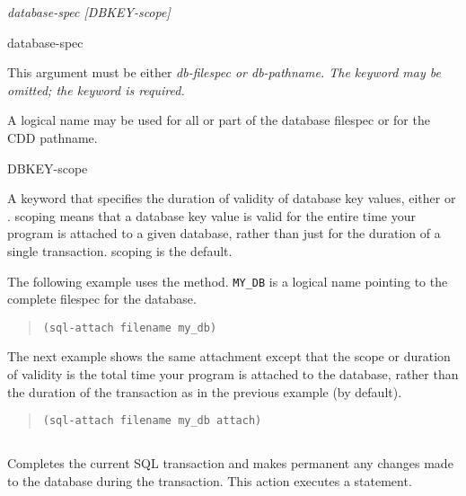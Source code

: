 {{\Format

 \it{database-spec} [\it{DBKEY-scope}]

\begin{arguments}
\item[database-spec]

  This argument must be either  \it{db-filespec} or
   \it{db-pathname}. The keyword  may be
  omitted; the keyword  is required.

  A logical name may be used for all or part of the database filespec
  or for the CDD pathname.

\item[DBKEY-scope]

  A keyword that specifies the duration of validity of database key
  values, either  or .  scoping
  means that a database key value is valid for the entire time your
  program is attached to a given database, rather than just for the
  duration of a single transaction.  scoping is the
  default.
\end{arguments}

\Example

The following example uses the  method. \verb|MY_DB| is a
logical name pointing to the complete filespec for the
database.

\begin{quote}
\begin{verbatim}
(sql-attach filename my_db)
\end{verbatim}
\end{quote}

The next example shows the same attachment except that the scope or
duration of  validity is the total time your program is attached
to the database, rather than the duration of the transaction as in the
previous example (by default).

\begin{quote}
\begin{verbatim}
(sql-attach filename my_db attach)
\end{verbatim}
\end{quote}

\subsection{}

Completes the current SQL transaction and makes permanent any changes
made to the database during the transaction. This action executes a
 statement.

}}
